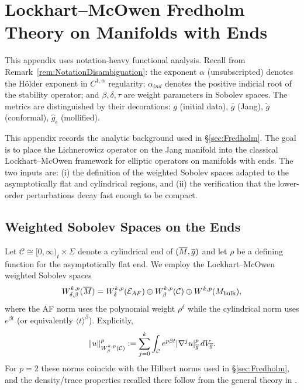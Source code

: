 \section{Lockhart--McOwen Fredholm Theory on Manifolds with Ends}
\label{app:Fredholm}

\begin{remark}
This appendix uses notation-heavy functional analysis. Recall from Remark~\ref{rem:NotationDisambiguation}: the exponent $\alpha$ (unsubscripted) denotes the H\"older exponent in $C^{1,\alpha}$ regularity; $\alpha_{ind}$ denotes the positive indicial root of the stability operator; and $\beta, \delta, \tau$ are weight parameters in Sobolev spaces. The metrics are distinguished by their decorations: $g$ (initial data), $\bar{g}$ (Jang), $\tilde{g}$ (conformal), $\hat{g}_\epsilon$ (mollified).
\end{remark}

This appendix records the analytic background used in \S\ref{sec:Fredholm}.  The goal is to place the Lichnerowicz operator on the Jang manifold into the classical Lockhart--McOwen framework for elliptic operators on manifolds with ends.  The two inputs are: (i) the definition of the weighted Sobolev spaces adapted to the asymptotically flat and cylindrical regions, and (ii) the verification that the lower-order perturbations decay fast enough to be compact.

\subsection{Weighted Sobolev Spaces on the Ends}

Let $\mathcal{C} \cong [0,\infty)_t \times \Sigma$ denote a cylindrical end of $(\overline{M},\overline{g})$ and let $\rho$ be a defining function for the asymptotically flat end.  We employ the Lockhart--McOwen weighted Sobolev spaces
\[
    W^{k,p}_{\delta,\beta}(\overline{M}) = W^{k,p}_{\delta}(\mathcal{E}_{AF}) \oplus W^{k,p}_{\beta}(\mathcal{C}) \oplus W^{k,p}(M_{\mathrm{bulk}}),
\]
where the AF norm uses the polynomial weight $\rho^{\delta}$ while the cylindrical norm uses $e^{\beta t}$ (or equivalently $\langle t \rangle^{\beta}$).  Explicitly,
\begin{equation}
    \|u\|_{W^{k,p}_{\beta}(\mathcal{C})}^p := \sum_{j=0}^k \int_{\mathcal{C}} e^{p\beta t} |\nabla^j u|^p_{\overline{g}} \, dV_{\overline{g}}.
\end{equation}
For $p=2$ these norms coincide with the Hilbert norms used in \S\ref{sec:Fredholm}, and the density/trace properties recalled there follow from the general theory in \cite{lockhartmccowen1985,melrose1996}.

